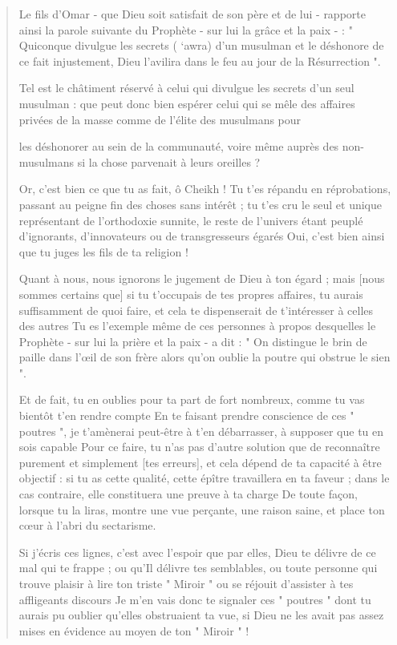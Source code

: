 \begin{quote}
Le fils d'Omar - que Dieu soit satisfait de son père et de lui -
rapporte ainsi la parole suivante du Prophète - sur lui la grâce et la
paix - : " Quiconque divulgue les secrets ( `awra) d'un musulman et le
déshonore de ce fait injustement, Dieu l'avilira dans le feu au jour de
la Résurrection ".

Tel est le châtiment réservé à celui qui divulgue les secrets d'un seul
musulman : que peut donc bien espérer celui qui se mêle des affaires
privées de la masse comme de l'élite des musulmans pour

les déshonorer au sein de la communauté, voire même auprès des
non-musulmans si la chose parvenait à leurs oreilles ?

Or, c'est bien ce que tu as fait, ô Cheikh ! Tu t'es répandu en
réprobations, passant au peigne fin des choses sans intérêt ; tu t'es
cru le seul et unique représentant de l'orthodoxie sunnite, le reste de
l'univers étant peuplé d'ignorants, d'innovateurs ou de transgresseurs
égarés Oui, c'est bien ainsi que tu juges les fils de ta religion !

Quant à nous, nous ignorons le jugement de Dieu à ton égard ; mais
{[}nous sommes certains que{]} si tu t'occupais de tes propres affaires,
tu aurais suffisamment de quoi faire, et cela te dispenserait de
t'intéresser à celles des autres Tu es l'exemple même de ces personnes à
propos desquelles le Prophète - sur lui la prière et la paix - a dit : "
On distingue le brin de paille dans l'œil de son frère alors qu'on
oublie la poutre qui obstrue le sien ".

Et de fait, tu en oublies pour ta part de fort nombreux, comme tu vas
bientôt t'en rendre compte En te faisant prendre conscience de ces "
poutres ", je t'amènerai peut-être à t'en débarrasser, à supposer que tu
en sois capable Pour ce faire, tu n'as pas d'autre solution que de
reconnaître purement et simplement {[}tes erreurs{]}, et cela dépend de
ta capacité à être objectif : si tu as cette qualité, cette épître
travaillera en ta faveur ; dans le cas contraire, elle constituera une
preuve à ta charge De toute façon, lorsque tu la liras, montre une vue
perçante, une raison saine, et place ton cœur à l'abri du sectarisme.

Si j'écris ces lignes, c'est avec l'espoir que par elles, Dieu te
délivre de ce mal qui te frappe ; ou qu'Il délivre tes semblables, ou
toute personne qui trouve plaisir à lire ton triste " Miroir " ou se
réjouit d'assister à tes affligeants discours Je m'en vais donc te
signaler ces " poutres " dont tu aurais pu oublier qu'elles obstruaient
ta vue, si Dieu ne les avait pas assez mises en évidence au moyen de ton
" Miroir " !


\end{quote}
